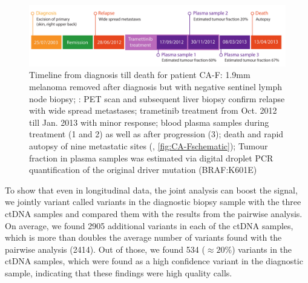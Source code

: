 \begin{figure}[ht]
\centering
\includegraphics[width=.99\linewidth]{Figures/jointVariantCalling/CA-F_timeline.pdf}
\caption[Timeline from diagnosis till death for patient CA-F]{Timeline from diagnosis till death for patient CA-F: 1.9mm melanoma removed after diagnosis  but with negative sentinel lymph node biopsy; : PET scan and subsequent liver biopsy confirm relapse with wide spread metastases; trametinib treatment from Oct. 2012 till Jan. 2013 with minor response; blood plasma samples during treatment (1 and 2) as well as after progression (3); death and rapid autopsy of nine metastatic sites (, \protect\autoref{fig:CA-Fschematic}); Tumour fraction in plasma samples was estimated via digital droplet PCR quantification of the original driver mutation (BRAF:K601E)}\label{fig:CA-Ftimeline}
\end{figure}


To show that even in longitudinal data, the joint analysis can boost the signal, we jointly variant called variants in the diagnostic biopsy sample with the three ctDNA samples and compared them with the results from the pairwise analysis. On average, we found 2905 additional variants in each of the ctDNA samples, which is more than doubles the average number of variants found with the pairwise analysis (2414). Out of those, we found 534 ($\approx 20\%$) variants in the ctDNA samples, which were found as a high confidence variant in the diagnostic sample, indicating that these findings were high quality calls. 

